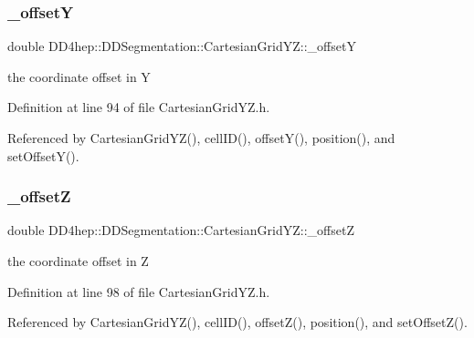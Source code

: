 \subsubsection{\texorpdfstring{\+\_\+offsetY}{\_offsetY}}
{\footnotesize\ttfamily double D\+D4hep\+::\+D\+D\+Segmentation\+::\+Cartesian\+Grid\+Y\+Z\+::\+\_\+offsetY\hspace{0.3cm}{\ttfamily [protected]}}



the coordinate offset in Y 



Definition at line 94 of file Cartesian\+Grid\+Y\+Z.\+h.



Referenced by Cartesian\+Grid\+Y\+Z(), cell\+I\+D(), offset\+Y(), position(), and set\+Offset\+Y().

\hypertarget{class_d_d4hep_1_1_d_d_segmentation_1_1_cartesian_grid_y_z_a4cd904d09e43a33180ef8c0951c99cc7}{}\label{class_d_d4hep_1_1_d_d_segmentation_1_1_cartesian_grid_y_z_a4cd904d09e43a33180ef8c0951c99cc7} 
\subsubsection{\texorpdfstring{\+\_\+offsetZ}{\_offsetZ}}
{\footnotesize\ttfamily double D\+D4hep\+::\+D\+D\+Segmentation\+::\+Cartesian\+Grid\+Y\+Z\+::\+\_\+offsetZ\hspace{0.3cm}{\ttfamily [protected]}}



the coordinate offset in Z 



Definition at line 98 of file Cartesian\+Grid\+Y\+Z.\+h.



Referenced by Cartesian\+Grid\+Y\+Z(), cell\+I\+D(), offset\+Z(), position(), and set\+Offset\+Z().

\hypertarget{class_d_d4hep_1_1_d_d_segmentation_1_1_cartesian_grid_y_z_ad7b9edca36f4b35162b3b49b3763e245}{}\label{class_d_d4hep_1_1_d_d_segmentation_1_1_cartesian_grid_y_z_ad7b9edca36f4b35162b3b49b3763e245} 
